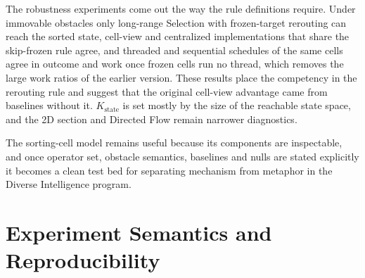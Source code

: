 \documentclass[11pt]{article}
\begin{document}
The robustness experiments come out the way the rule definitions require. Under immovable
obstacles only long-range Selection with frozen-target rerouting can reach the sorted state,
cell-view and centralized implementations that share the skip-frozen rule agree, and threaded and
sequential schedules of the same cells agree in outcome and work once frozen cells run no thread,
which removes the large work ratios of the earlier version. These results place the competency in
the rerouting rule and suggest that the original cell-view advantage came from baselines without
it. $K_{\mathrm{state}}$ is set mostly by the size of the reachable state space, and the 2D section
and Directed Flow remain narrower diagnostics.

The sorting-cell model remains useful because its components are inspectable, and once operator
set, obstacle semantics, baselines and nulls are stated explicitly it becomes a clean test bed for
separating mechanism from metaphor in the Diverse Intelligence program.

\appendix

\section{Experiment Semantics and Reproducibility}
\label{sec:appendix-repro}
\end{document}

